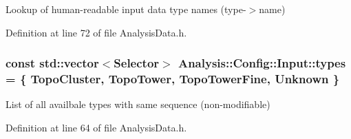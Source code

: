 Lookup of human-\/readable input data type names (type-\/$>$name) 



Definition at line 72 of file Analysis\+Data.\+h.

\subsubsection[{\texorpdfstring{types}{types}}]{\setlength{\rightskip}{0pt plus 5cm}const std\+::vector$<${\bf Selector}$>$ Analysis\+::\+Config\+::\+Input\+::types = \{ {\bf Topo\+Cluster}, {\bf Topo\+Tower}, {\bf Topo\+Tower\+Fine}, {\bf Unknown} \}\hspace{0.3cm}{\ttfamily [static]}}\hypertarget{namespaceAnalysis_1_1Config_1_1Input_aad61028452c46869efe0b2dc1274a2b6}{}\label{namespaceAnalysis_1_1Config_1_1Input_aad61028452c46869efe0b2dc1274a2b6}


List of all availbale types with same sequence (non-\/modifiable) 



Definition at line 64 of file Analysis\+Data.\+h.

